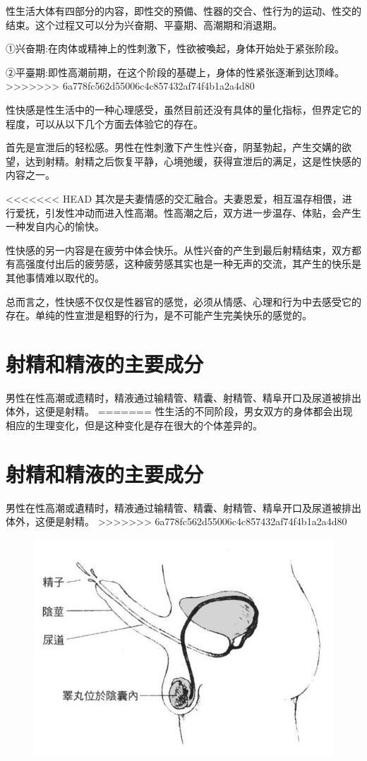\documentclass[12pt,UTF8]{ctexbook}
\begin{document}
性生活大体有四部分的内容，即性交的預備、性器的交合、性行为的运动、性交的结束。这个过程又可以分为兴奋期、平臺期、高潮期和消退期。

①兴奋期:在肉体或精神上的性刺激下，性欲被喚起，身体开始处于紧张阶段。

②平臺期:即性高潮前期，在这个阶段的基礎上，身体的性紧张逐漸到达顶峰。
>>>>>>> 6a778fc562d55006c4c857432af74f4b1a2a4d80

性快感是性生活中的一种心理感受，虽然目前还没有具体的量化指标，但界定它的程度，可以从以下几个方面去体验它的存在。

首先是宣泄后的轻松感。男性在性刺激下产生性兴奋，阴茎勃起，产生交媾的欲望，达到射精。射精之后恢复平静，心境弛缓，获得宣泄后的满足，这是性快感的内容之一。

<<<<<<< HEAD
其次是夫妻情感的交汇融合。夫妻恩爱，相互温存相偎，进行爱抚，引发性冲动而进入性高潮。性高潮之后，双方进一步温存、体贴，会产生一种发自内心的愉快。

性快感的另一内容是在疲劳中体会快乐。从性兴奋的产生到最后射精结束，双方都有高强度付出后的疲劳感，这种疲劳感其实也是一种无声的交流，其产生的快乐是其他事情难以取代的。

总而言之，性快感不仅仅是性器官的感觉，必须从情感、心理和行为中去感受它的存在。单纯的性宣泄是粗野的行为，是不可能产生完美快乐的感觉的。

\section{射精和精液的主要成分}

男性在性高潮或遗精时，精液通过输精管、精囊、射精管、精阜开口及尿道被排出体外，这便是射精。
=======
性生活的不同阶段，男女双方的身体都会出现相应的生理变化，但是这种变化是存在很大的个体差异的。

\section{射精和精液的主要成分}

男性在性高潮或遺精时，精液通过输精管、精囊、射精管、精阜开口及尿道被排出体外，这便是射精。
>>>>>>> 6a778fc562d55006c4c857432af74f4b1a2a4d80

\begin{figure}[htbp]
	\centering
	\includegraphics[width=0.7\linewidth]{5}
	\caption{}
\end{figure}
\end{document}
